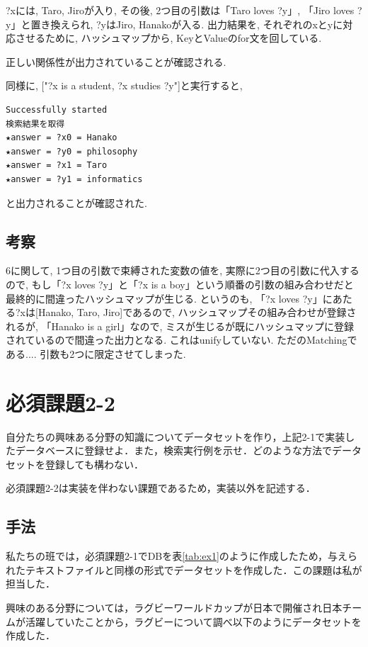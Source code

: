 \documentclass[12pt]{jarticle}
\begin{document}
?xには, Taro, Jiroが入り, その後, 2つ目の引数は「Taro loves ?y」, 「Jiro loves ?y」と置き換えられ, ?yはJiro, Hanakoが入る. 出力結果を, それぞれのxとyに対応させるために, ハッシュマップから, KeyとValueのfor文を回している.

正しい関係性が出力されていることが確認される.

同様に, ["?x is a student, ?x studies ?y"]と実行すると,
\begin{lstlisting}
Successfully started
検索結果を取得
★answer = ?x0 = Hanako
★answer = ?y0 = philosophy
★answer = ?x1 = Taro
★answer = ?y1 = informatics
\end{lstlisting}
と出力されることが確認された.


\subsection{考察}
6に関して, 1つ目の引数で束縛された変数の値を, 実際に2つ目の引数に代入するので, もし「?x loves ?y」と「?x is a boy」という順番の引数の組み合わせだと最終的に間違ったハッシュマップが生じる. というのも, 「?x loves ?y」にあたる?xは[Hanako, Taro, Jiro]であるので, ハッシュマップその組み合わせが登録されるが, 「Hanako is a girl」なので, ミスが生じるが既にハッシュマップに登録されているので間違った出力となる.
これはunifyしていない. ただのMatchingである....
引数も2つに限定させてしまった.

\section{必須課題2-2}
\begin{screen}
  自分たちの興味ある分野の知識についてデータセットを作り，上記2-1で実装したデータベースに登録せよ．また，検索実行例を示せ．どのような方法でデータセットを登録しても構わない．
\end{screen}
必須課題2-2は実装を伴わない課題であるため，実装以外を記述する．

\subsection{手法}
私たちの班では，必須課題2-1でDBを表\ref{tab:ex1}のように作成したため，与えられたテキストファイルと同様の形式でデータセットを作成した．この課題は私が担当した．\par
興味のある分野については，ラグビーワールドカップが日本で開催され日本チームが活躍していたことから，ラグビーについて調べ以下のようにデータセットを作成した．\\
\end{document}
